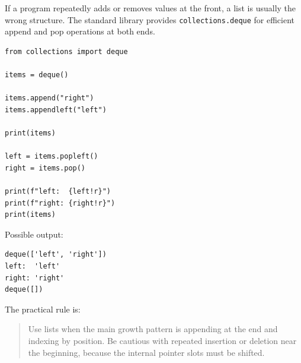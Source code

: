If a program repeatedly adds or removes values at the front, a list is usually the wrong structure. The standard library provides \texttt{collections.deque} for efficient append and pop operations at both ends.

\begin{verbatim}
from collections import deque

items = deque()

items.append("right")
items.appendleft("left")

print(items)

left = items.popleft()
right = items.pop()

print(f"left:  {left!r}")
print(f"right: {right!r}")
print(items)
\end{verbatim}

Possible output:

\begin{verbatim}
deque(['left', 'right'])
left:  'left'
right: 'right'
deque([])
\end{verbatim}

The practical rule is:

\begin{quote}
Use lists when the main growth pattern is appending at the end and indexing by position. Be cautious with repeated insertion or deletion near the beginning, because the internal pointer slots must be shifted.
\end{quote}